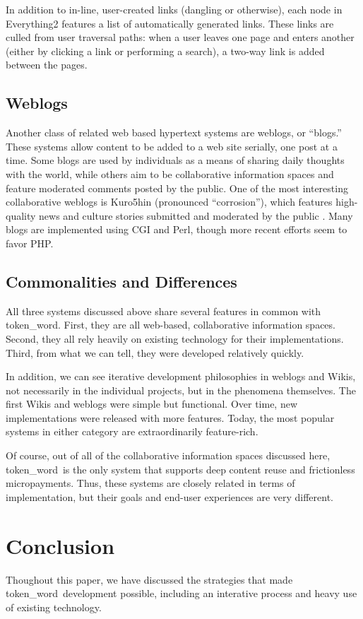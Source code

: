 \documentclass{acm_proc_article-sp}
\newcommand{\tw}{token\_word}
\begin{document}
In addition to in-line, user-created links (dangling or otherwise), each node in Everything2 features a list of automatically generated links.
These links are culled from user traversal paths:  when a user leaves one page and enters another (either by clicking a link or performing a search), a two-way link is added between the pages.   


\subsection{Weblogs}
Another class of related web based hypertext systems are weblogs, or ``blogs.''
These systems allow content to be added to a web site serially, one post at a time.
Some blogs are used by individuals as a means of sharing daily thoughts with the world, while others aim to be collaborative information spaces and feature moderated comments posted by the public.
One of the most interesting collaborative weblogs is Kuro5hin (pronounced ``corrosion''), which features high-quality news and culture stories submitted and moderated by the public \cite{kuro5hin}.
Many blogs are implemented using CGI and Perl, though more recent efforts seem to favor PHP.


\subsection{Commonalities and Differences}
All three systems discussed above share several features in common with \tw.
First, they are all web-based, collaborative information spaces.
Second, they all rely heavily on existing technology for their implementations.
Third, from what we can tell, they were developed relatively quickly.

In addition, we can see iterative development philosophies in weblogs and Wikis, not necessarily in the individual projects, but in the phenomena themselves.
The first Wikis and weblogs were simple but functional.
Over time, new implementations were released with more features.
Today, the most popular systems in either category are extraordinarily feature-rich.

Of course, out of all of the collaborative information spaces discussed here, \tw \  is the only system that supports deep content reuse and frictionless micropayments.
Thus, these systems are closely related in terms of implementation, but their goals and end-user experiences are very different. 




\section{Conclusion}
Thoughout this paper, we have discussed the strategies that made \tw \  development possible, including an interative process and heavy use of existing technology.
\end{document}
